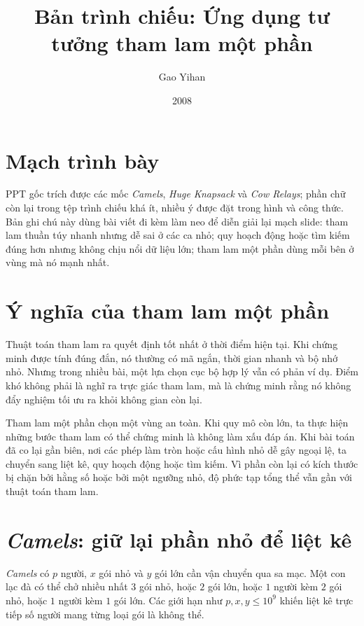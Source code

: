 \documentclass[11pt]{article}
\title{Bản trình chiếu: Ứng dụng tư tưởng tham lam một phần}
\author{Gao Yihan}
\date{2008}
\begin{document}
\maketitle


\section{Mạch trình bày}

PPT gốc trích được các mốc \textit{Camels}, \textit{Huge Knapsack} và
\textit{Cow Relays}; phần chữ còn lại trong tệp trình chiếu khá ít, nhiều ý
được đặt trong hình và công thức. Bản ghi chú này dùng bài viết đi kèm làm
neo để diễn giải lại mạch slide: tham lam thuần túy nhanh nhưng dễ sai ở các
ca nhỏ; quy hoạch động hoặc tìm kiếm đúng hơn nhưng không chịu nổi dữ liệu
lớn; tham lam một phần dùng mỗi bên ở vùng mà nó mạnh nhất.

\section{Ý nghĩa của tham lam một phần}

Thuật toán tham lam ra quyết định tốt nhất ở thời điểm hiện tại. Khi chứng
minh được tính đúng đắn, nó thường có mã ngắn, thời gian nhanh và bộ nhớ nhỏ.
Nhưng trong nhiều bài, một lựa chọn cục bộ hợp lý vẫn có phản ví dụ. Điểm
khó không phải là nghĩ ra trực giác tham lam, mà là chứng minh rằng nó không
đẩy nghiệm tối ưu ra khỏi không gian còn lại.

Tham lam một phần chọn một vùng an toàn. Khi quy mô còn lớn, ta thực hiện
những bước tham lam có thể chứng minh là không làm xấu đáp án. Khi bài toán
đã co lại gần biên, nơi các phép làm tròn hoặc cấu hình nhỏ dễ gây ngoại lệ,
ta chuyển sang liệt kê, quy hoạch động hoặc tìm kiếm. Vì phần còn lại có kích
thước bị chặn bởi hằng số hoặc bởi một ngưỡng nhỏ, độ phức tạp tổng thể vẫn
gần với thuật toán tham lam.

\section{\textit{Camels}: giữ lại phần nhỏ để liệt kê}

\textit{Camels} có \(p\) người, \(x\) gói nhỏ và \(y\) gói lớn cần vận chuyển
qua sa mạc. Một con lạc đà có thể chở nhiều nhất \(3\) gói nhỏ, hoặc \(2\)
gói lớn, hoặc \(1\) người kèm \(2\) gói nhỏ, hoặc \(1\) người kèm \(1\) gói
lớn. Các giới hạn như \(p,x,y\le 10^9\) khiến liệt kê trực tiếp số người mang
từng loại gói là không thể.
\end{document}
